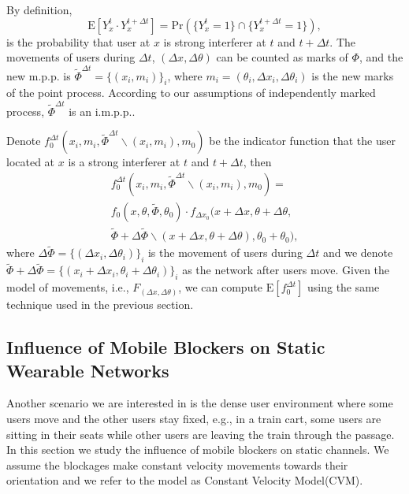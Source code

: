 \documentclass[10pt, conference, letterpaper]{IEEEtran}
\begin{document}
By definition, 
\begin{equation*}
\mathrm{E}[Y_x^t\cdot Y_x^{t + \Delta t}] = \mathrm{Pr}(\{Y_x^t=1\}\cap \{Y_x^{t+\Delta t}=1\}),
\end{equation*}
is the probability that user at $x$ is strong interferer at $t$ and $t + \Delta t$. The movements of users during $\Delta t$, $(\Delta x, \Delta \theta)$ can be counted as marks of $\Phi$, and the new m.p.p. is $\tilde{\Phi}^{\Delta t} = \{(x_i, m_i)\}_i$, where $m_i = (\theta_i, \Delta x_i, \Delta \theta_i)$ is the new marks of the point process. According to our assumptions of independently marked process, $\tilde{\Phi}^{\Delta t}$ is an i.m.p.p.. 

Denote $f_0^{\Delta  t}(x_i, m_i, \tilde{\Phi}^{\Delta t}\backslash (x_i, m_i), m_0)$ be the indicator function that the user located at $x$ is a strong interferer at $t$ and $t + \Delta t$, then 
\begin{multline*}
f_0^{\Delta  t}(x_i, m_i, \tilde{\Phi}^{\Delta t}\backslash (x_i, m_i), m_0) = \\
f_0(x,\theta, \tilde{\Phi}, \theta_0) 
\cdot f_{\Delta x_0}(x+\Delta x,\theta + \Delta \theta, 
\\ \tilde{\Phi} + \Delta \tilde{\Phi}\backslash (x+\Delta x,\theta + \Delta \theta), \theta_0+\theta_0),
\end{multline*}
where $\Delta \tilde{\Phi} = \{(\Delta x_i, \Delta \theta_i)\}_i$ is the movement of users during $\Delta t$ and we denote $\tilde{\Phi} + \Delta \tilde{\Phi} = \{(x_i+\Delta x_i, \theta_i + \Delta \theta_i)\}_i$ as the network after users move.  
Given the model of movements, i.e., $F_{(\Delta x, \Delta \theta)}$, we can compute $\mathrm{E}[f_0^{\Delta t}]$ using the same technique used in the previous section. 


\subsection{Influence of Mobile Blockers on Static Wearable Networks}\label{subsection:largemobility}
Another scenario we are interested in is the dense user environment where some users move and the other users stay fixed, e.g., in a train cart, some users are sitting in their seats while other users are leaving the train through the passage. 
In this section we study the influence of mobile blockers on static channels. We assume the blockages make constant velocity movements towards their orientation and we refer to the model as Constant Velocity Model(CVM).
\end{document}
